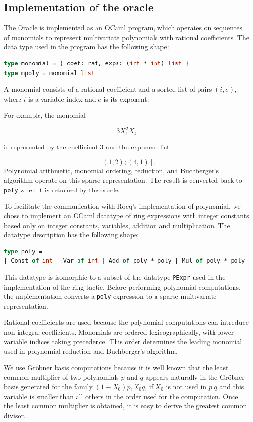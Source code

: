 \documentclass[11pt]{article}
\begin{document}
\subsection{Implementation of the oracle}
The Oracle is implemented as an OCaml program, which operates on sequences of
monomials to represent multivariate polynomials with rational coefficients.
The data type used in the program has the following shape:
\begin{lstlisting}[language=ML]
type monomial = { coef: rat; exps: (int * int) list }
type mpoly = monomial list
\end{lstlisting}
A monomial
consists of a rational coefficient and a sorted list of pairs $(i,e)$, where
$i$ is a variable index and $e$ is its exponent:


For example, the monomial

$$
  3X_1^2X_4
$$

is represented by the coefficient $3$ and the exponent list

$$
  [(1,2);(4,1)].
$$
Polynomial arithmetic, monomial ordering, reduction, and Buchberger's
algorithm operate on this sparse representation. The result is converted back
to \texttt{poly} when it is returned by the oracle.

To facilitate the communication with Rocq's implementation of polynomial, we
chose to implement an OCaml datatype of ring expressions with integer
constants based only on integer constants, variables, addition and
multiplication.  The datatype description has the following shape:
\begin{lstlisting}[language=ML]
type poly =
| Const of int | Var of int | Add of poly * poly | Mul of poly * poly
\end{lstlisting}
This datatype is isomorphic to a subset of the datatype {\tt PExpr} used in
the implementation of the ring tactic.
Before performing polynomial computations, the implementation converts a
\texttt{poly} expression to a sparse multivariate representation.

Rational coefficients are used because the polynomial
computations can introduce non-integral coefficients. Monomials are ordered
lexicographically, with lower variable indices taking precedence. This order
determines the leading monomial used in polynomial reduction and
Buchberger's algorithm.

We use Gröbner basis computations because it is well known that the
least common multiplier of two polynomials \(p\) and \(q\) appears naturally
in the Gröbner basis generated for the family \((1 - X_0) p, X_0 q\), if \(X_0\)
is not used in \(p\) \(q\) and this variable is smaller than all others in the
order used for the computation.  Once the least common multiplier is obtained,
it is easy to derive the greatest common divisor.
\end{document}
